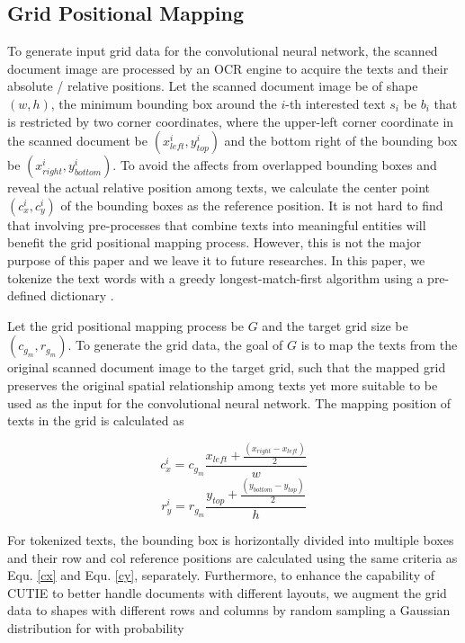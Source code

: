 \documentclass[10pt,twocolumn,letterpaper]{article}
\begin{document}
\subsection{Grid Positional Mapping}
\label{pm}
To generate input grid data for the convolutional neural network, the scanned document image are processed by an OCR engine to acquire the texts and their absolute / relative positions. Let the scanned document image be of shape $(w, h)$, the minimum bounding box around the $i$-th interested text $s_i$ be $b_i$ that is restricted by two corner coordinates, where the upper-left corner coordinate in the scanned document be $(x^i_{left}, y^i_{top})$ and the bottom right of the bounding box be $(x^i_{right}, y^i_{bottom})$. To avoid the affects from overlapped bounding boxes and reveal the actual relative position among texts, we calculate the center point $(c^i_x, c^i_y)$ of the bounding boxes as the reference position. It is not hard to find that involving pre-processes that combine texts into meaningful entities will benefit the grid positional mapping process. However, this is not the major purpose of this paper and we leave it to future researches. In this paper, we tokenize the text words with a greedy longest-match-first algorithm using a pre-defined dictionary \cite{bertgit}. 

Let the grid positional mapping process be $G$ and the target grid size be $(c_{g_m}, r_{g_m})$. To generate the grid data, the goal of $G$ is to map the texts from the original scanned document image to the target grid, such that the mapped grid preserves the original spatial relationship among texts yet more suitable to be used as the input for the convolutional neural network. The mapping position of texts in the grid is calculated as

\begin{equation}
\label{cx}
c^i_x = c_{g_m} \frac{x_{left} + \frac{(x_{right} - x_{left})}{2}}{w}
\end{equation}
\begin{equation}
\label{cy}
r^i_y = r_{g_m} \frac{y_{top} + \frac{(y_{bottom} - y_{top})}{2}}{h}
\end{equation}

For tokenized texts, the bounding box is horizontally divided into multiple boxes and their row and col reference positions are calculated using the same criteria as Equ. \ref{cx} and Equ. \ref{cy}, separately. Furthermore, to enhance the capability of CUTIE to better handle documents with different layouts, we augment the grid data to shapes with different rows and columns by random sampling a Gaussian distribution for with probability
\end{document}
